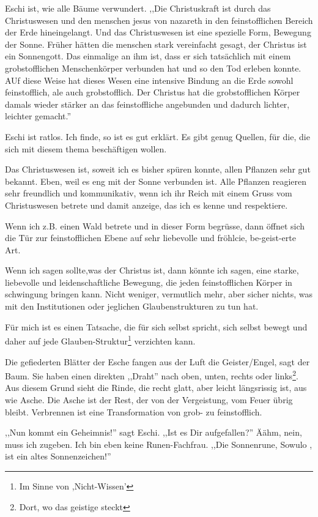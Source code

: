 \documentclass[11pt,titlepage,a5paper]{book}
\begin{document}
Eschi ist, wie alle Bäume verwundert. ,,Die Christuskraft ist durch das Christuswesen und den menschen jesus von nazareth in den feinstofflichen Bereich der Erde hineingelangt. Und das Christuswesen ist eine spezielle Form, Bewegung der Sonne. Früher hätten die menschen stark vereinfacht gesagt, der Christus ist ein Sonnengott. Das einmalige an ihm ist, dass er sich tatsächlich mit einem grobstofflichen Menschenkörper verbunden hat und so den Tod erleben konnte. AUf diese Weise hat dieses Wesen eine intensive Bindung an die Erde sowohl feinstofflich, ale auch grobstofflich. Der Christus hat die grobstofflichen Körper damals wieder stärker an das feinstoffliche angebunden und dadurch lichter, leichter gemacht.''

Eschi ist ratlos. Ich finde, so ist es gut erklärt. Es gibt genug Quellen, für die, die sich mit diesem thema beschäftigen wollen.

Das Christuswesen ist, soweit ich es bisher spüren konnte, allen Pflanzen sehr gut bekannt. Eben, weil es eng mit der Sonne verbunden ist. Alle Pflanzen reagieren sehr freundlich und kommunikativ, wenn ich ihr Reich mit einem Gruss vom Christuswesen betrete und damit anzeige, das ich es kenne und respektiere.

Wenn ich z.B. einen Wald betrete und in dieser Form begrüsse, dann öffnet sich die Tür zur feinstofflichen Ebene auf sehr liebevolle und fröhlcie, be-geist-erte Art.

Wenn ich sagen sollte,was der Christus ist, dann könnte ich sagen, eine starke, liebevolle und leidenschaftliche Bewegung, die jeden feinstofflichen Körper in schwingung bringen kann. Nicht weniger, vermutlich mehr, aber sicher nichts, was mit den Institutionen oder jeglichen Glaubenstrukturen zu tun hat.

Für mich ist es einen Tatsache, die für sich selbst spricht, sich selbst bewegt und daher auf jede Glauben-Struktur\footnote{Im Sinne von ,Nicht-Wissen'} verzichten kann.

Die gefiederten Blätter der Esche fangen aus der Luft die Geister/Engel, sagt der Baum. Sie haben einen direkten ,,Draht'' nach oben, unten, rechts oder links\footnote{Dort, wo das geistige steckt}. Aus diesem Grund sieht die Rinde, die recht glatt, aber leicht längsrissig ist, aus wie Asche. Die Asche ist der Rest, der von der Vergeistung, vom Feuer übrig bleibt. Verbrennen ist eine Transformation von grob- zu feinstofflich.

,,Nun kommt ein Geheimnis!'' sagt Eschi. ,,Ist es Dir aufgefallen?'' Äähm, nein, muss ich zugeben. Ich bin eben keine Runen-Fachfrau. ,,Die Sonnenrune, Sowulo , ist ein altes Sonnenzeichen!''
\end{document}

